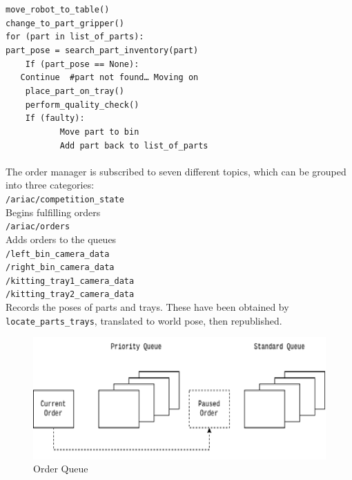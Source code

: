 \documentclass{uva-inf-article}
\begin{document}
	\noindent \verb|move_robot_to_table()|\\
	\verb|change_to_part_gripper()|\\
	\verb|for (part in list_of_parts):|\\
		\verb|part_pose = search_part_inventory(part)|\\
		\verb|    If (part_pose == None):|\\
			\verb|   Continue  #part not found… Moving on|\\
		\verb|    place_part_on_tray()|\\
		\verb|    perform_quality_check()|\\
		\verb|    If (faulty):|\\
			\verb|           Move part to bin|\\
			\verb|           Add part back to list_of_parts|\\\\


The order manager is subscribed to seven different topics, which can be grouped into three categories:\\
\noindent
\verb|/ariac/competition_state|\\ 
Begins fulfilling orders\\

\noindent
\verb|/ariac/orders|\\
Adds orders to the queues\\

\noindent
\verb|/left_bin_camera_data|\\
\verb|/right_bin_camera_data|\\
\verb|/kitting_tray1_camera_data|\\
\verb|/kitting_tray2_camera_data|\\
Records the poses of parts and trays. These have been obtained by \verb|locate_parts_trays|, translated to world pose, then republished.\\



\begin{figure}[h]
    \centering
    \includegraphics[scale=0.75]{images/queOrd.png}
    \caption{Order Queue}
    \label{fig:queOrd}
\end{figure}
\end{document}
